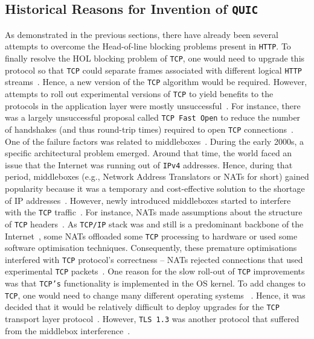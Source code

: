 \documentclass[12pt,a4paper]{report}
\begin{document}
\subsection{Historical Reasons for Invention of \texttt{QUIC}}
As demonstrated in the previous sections, there have already been several attempts to overcome the Head-of-line blocking problems present in \texttt{HTTP}.
To finally resolve the HOL blocking problem of \texttt{TCP}, one would need to upgrade this protocol so that \texttt{TCP} could separate frames associated with different logical \texttt{HTTP} streams~\cite{head-of-line-blocking-in-quic-and-http-3-the-details}.
Hence, a new version of the \texttt{TCP} algorithm would be required. 
However, attempts to roll out experimental versions of \texttt{TCP} to yield benefits to the protocols in the application layer were mostly unsuccessful~\cite{bib_Netdev_0x13_QUIC_Tutorial, PollardBarry2019HiAP}.
For instance, there was a largely unsuccessful proposal called \texttt{TCP Fast Open} to reduce the number of handshakes (and thus round-trip times) required to open \texttt{TCP} connections~\cite{the-sad-story-of-tcp-fast-open}.
One of the failure factors was related to middleboxes~\cite{the-sad-story-of-tcp-fast-open}.
During the early 2000s, a specific architectural problem emerged.
Around that time, the world faced an issue that the Internet was running out of \texttt{IPv4} addresses.
Hence, during that period, middleboxes (e.g., Network Address Translators or NATs for short) gained popularity because it was a temporary and cost-effective solution to the shortage of IP addresses~\cite{MurphyNiallRichard2005Ina, bib_Netdev_0x13_QUIC_Tutorial}.
However, newly introduced middleboxes started to interfere with the \texttt{TCP} traffic~\cite{bib_Netdev_0x13_QUIC_Tutorial, PollardBarry2019HiAP}.
For instance, NATs made assumptions about the structure of \texttt{TCP} headers~\cite{bib_Netdev_0x13_QUIC_Tutorial, PollardBarry2019HiAP}.
As \texttt{TCP/IP} stack was and still is a predominant backbone of the Internet~\cite{tcp-ip-stack_shtml}, some NATs offloaded some \texttt{TCP} processing to hardware or used some software optimisation techniques.
Consequently, these premature optimisations interfered with \texttt{TCP} protocol's correctness -- NATs rejected connections that used experimental \texttt{TCP} packets~\cite{PollardBarry2019HiAP}.
One reason for the slow roll-out of \texttt{TCP} improvements was that \texttt{TCP's} functionality is implemented in the OS kernel.
To add changes to \texttt{TCP}, one would need to change many different operating systems ~\cite{PollardBarry2019HiAP}.
Hence, it was decided that it would be relatively difficult to deploy upgrades for the \texttt{TCP} transport layer protocol~\cite{head-of-line-blocking-in-quic-and-http-3-the-details}.
However, \texttt{TLS 1.3} was another protocol that suffered from the middlebox interference~\cite{why-tls-1-3-isnt-in-browsers-yet}.
\end{document}
